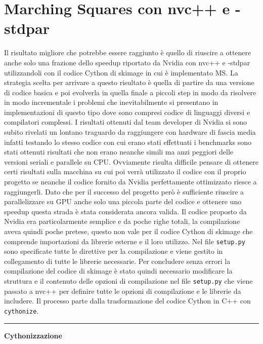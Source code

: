\documentclass[12pt,a4paper]{report}
\begin{document}
\section{Marching Squares con nvc++ e -stdpar}
Il risultato migliore che potrebbe essere raggiunto è quello di riuscire a ottenere anche solo una frazione dello speedup riportato da Nvidia con nvc++ e -stdpar utilizzandoli con il codice Cython di skimage in cui è implementato MS.\newline
La strategia scelta per arrivare a questo risultato è quella di partire da una versione di codice basica e poi evolverla in quella finale a piccoli step in modo da risolvere in modo incrementale i problemi che inevitabilmente si presentano in implementazioni di questo tipo dove sono compresi codice di linguaggi diversi e compilatori complessi. \newline 
I risultati ottenuti dal team developer di Nvidia si sono subito rivelati un lontano traguardo da raggiungere con hardware di fascia media infatti testando lo stesso codice con cui erano stati effettuati i benchmarks sono stati ottenuti risultati che non erano neanche simili ma anzi peggiori delle versioni seriali e parallele su CPU. Ovviamente risulta difficile pensare di ottenere certi risultati sulla macchina su cui poi verrà utilizzato il codice con il proprio progetto se neanche il codice fornito da Nvidia perfettamente ottimizzato riesce a raggiungerli. Dato che per il successo del progetto però è sufficiente riuscire a parallelizzare su GPU anche solo una piccola parte del codice e ottenere uno speedup questa strada è stata considerata ancora valida. \newline
Il codice proposto da Nvidia era particolarmente semplice e da poche righe totali, la compilazione aveva quindi poche pretese, questo non vale per il codice Cython di skimage che comprende importazioni da librerie esterne e il loro utilizzo. Nel file \verb|setup.py| sono specificate tutte le direttive per la compilazione e viene gestito in collegamento di tutte le librerie necessarie. Per concludere senza errori la compilazione del codice di skimage è stato quindi necessario modificare la struttura e il contenuto delle opzioni di compilazione nel file \verb|setup.py| che viene passato a nvc++ per definire tutte le opzioni di compilazione e le librerie da includere. \newline
Il processo parte dalla trasformazione del codice Cython in C++ con \verb|cythonize|. \\[10pt]
\noindent\rule[0.5ex]{\linewidth}{2pt}
\small{\textbf{Cythonizzazione}} \\
\end{document}
